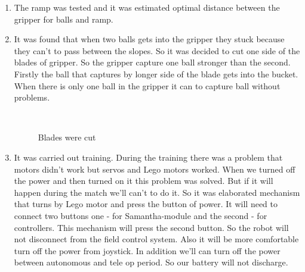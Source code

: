 \begin{enumerate}
\begin{enumerate}
		 
		 \item The ramp was tested and it was estimated optimal distance between the gripper for balls and ramp.
		 
		 \item It was found that when two balls gets into the gripper they stuck because they can't to pass between the slopes. So it was decided to cut one side of the blades of gripper. So the gripper capture one ball stronger than the second. Firstly the ball that captures by longer side of the blade gets into the bucket. When there is only one ball in the gripper it can to capture ball without problems.
		 		         \begin{figure}[H]
		 		         	\begin{minipage}[h]{0.2\linewidth}
		 		         		\center  
		 		         	\end{minipage}
		 		         	\begin{minipage}[h]{0.6\linewidth}
		 		         		\caption{Blades were cut}
		 		         	\end{minipage}
		 		         \end{figure}		 
		 
		 \item It was carried out training. During the training there was a problem that motors didn't work but servos and Lego motors worked. When we turned off the power and then turned on it this problem was solved. But if it will happen during the match we'll can't to do it. So it was elaborated mechanism that turns by Lego motor and press the button of power. It will need to connect two buttons one - for Samantha-module and the second - for controllers. This mechanism will press the second button. So the robot will not disconnect from the field control system. Also it will be more comfortable turn off the power from joystick. In addition we'll can turn off the power between autonomous and tele op period. So our battery will not discharge.
		 

\end{enumerate}
\end{enumerate}
